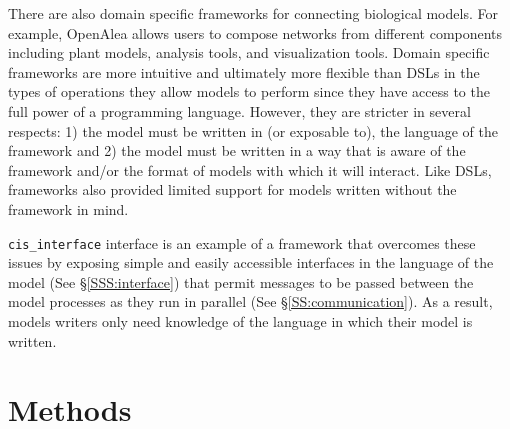 \documentclass[journal]{IEEEtran}
\newcommand{\cis}{{\tt cis\_interface}{}}
\begin{document}
There are also domain specific frameworks for connecting biological models. For example, OpenAlea \citep{Pradal2015} allows users to compose networks from different components including plant models, analysis tools, and visualization tools. Domain specific frameworks are more intuitive and ultimately more flexible than DSLs in the types of operations they allow models to perform since they have access to the full power of a programming language. However, they are stricter in several respects: 1) the model must be written in (or exposable to), the language of the framework and 2) the model must be written in a way that is aware of the framework and/or the format of models with which it will interact. Like DSLs, frameworks also provided limited support for models written without the framework in mind. 

{\cis} interface is an example of a framework that overcomes these issues by exposing simple and easily accessible interfaces in the language of the model (See \S\ref{SSS:interface}) that permit messages to be passed between the model processes as they run in parallel (See \S\ref{SS:communication}). As a result, models writers only need knowledge of the language in which their model is written.

%

\section{Methods}\label{S:methods}
\end{document}
